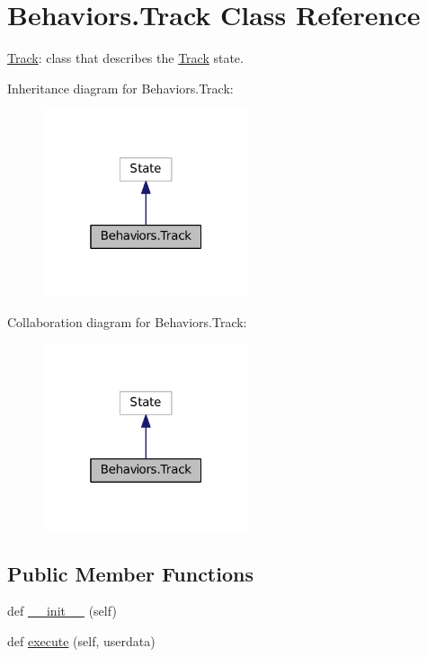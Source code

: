 \hypertarget{classBehaviors_1_1Track}{}\section{Behaviors.\+Track Class Reference}
\label{classBehaviors_1_1Track}


\hyperlink{classBehaviors_1_1Track}{Track}\+: class that describes the \hyperlink{classBehaviors_1_1Track}{Track} state.  




Inheritance diagram for Behaviors.\+Track\+:\nopagebreak
\begin{figure}[H]
\begin{center}
\leavevmode
\includegraphics[width=172pt]{classBehaviors_1_1Track__inherit__graph}
\end{center}
\end{figure}


Collaboration diagram for Behaviors.\+Track\+:\nopagebreak
\begin{figure}[H]
\begin{center}
\leavevmode
\includegraphics[width=172pt]{classBehaviors_1_1Track__coll__graph}
\end{center}
\end{figure}
\subsection*{Public Member Functions}
\begin{DoxyCompactItemize}
\item 
def \hyperlink{classBehaviors_1_1Track_ad4b822d13b3152463dfae09b7857cafe}{\+\_\+\+\_\+init\+\_\+\+\_\+} (self)
\item 
def \hyperlink{classBehaviors_1_1Track_a35b652d080f4b24379d06d0875c60658}{execute} (self, userdata)
\end{DoxyCompactItemize}


